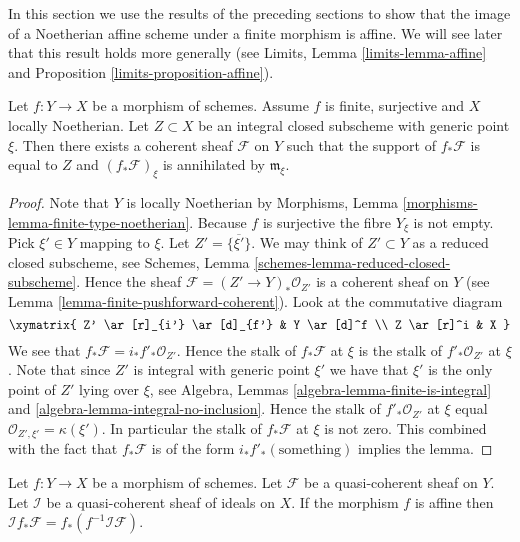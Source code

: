 \noindent
In this section we use the results of the preceding sections
to show that the image of a Noetherian affine scheme under a finite
morphism is affine. We will see later that this result holds more
generally (see Limits, Lemma \ref{limits-lemma-affine} and
Proposition \ref{limits-proposition-affine}).

\begin{lemma}
\label{lemma-finite-morphism-Noetherian}
Let $f : Y \to X$ be a morphism of schemes.
Assume $f$ is finite, surjective and $X$ locally Noetherian.
Let $Z \subset X$ be an integral closed subscheme with
generic point $\xi$. Then
there exists a coherent sheaf $\mathcal{F}$ on $Y$
such that the support of $f_*\mathcal{F}$ is equal to $Z$
and $(f_*\mathcal{F})_\xi$ is annihilated by $\mathfrak m_\xi$.
\end{lemma}

\begin{proof}
Note that $Y$ is locally Noetherian by
Morphisms, Lemma \ref{morphisms-lemma-finite-type-noetherian}.
Because $f$ is surjective the fibre $Y_\xi$ is not empty.
Pick $\xi' \in Y$ mapping to $\xi$. Let $Z' = \overline{\{\xi'\}}$.
We may think of $Z' \subset Y$ as a reduced closed subscheme,
see Schemes, Lemma \ref{schemes-lemma-reduced-closed-subscheme}.
Hence the sheaf $\mathcal{F} = (Z' \to Y)_*\mathcal{O}_{Z'}$
is a coherent sheaf on $Y$ (see
Lemma \ref{lemma-finite-pushforward-coherent}).
Look at the commutative diagram
$$
\xymatrix{
Z' \ar[r]_{i'} \ar[d]_{f'} &
Y \ar[d]^f \\
Z \ar[r]^i &
X
}
$$
We see that $f_*\mathcal{F} = i_*f'_*\mathcal{O}_{Z'}$.
Hence the stalk of $f_*\mathcal{F}$ at $\xi$ is the stalk
of $f'_*\mathcal{O}_{Z'}$ at $\xi$. Note that since $Z'$ is
integral with generic point $\xi'$ we have that
$\xi'$ is the only point of $Z'$ lying over $\xi$, see
Algebra, Lemmas \ref{algebra-lemma-finite-is-integral} and
\ref{algebra-lemma-integral-no-inclusion}.
Hence the stalk of $f'_*\mathcal{O}_{Z'}$ at $\xi$
equal $\mathcal{O}_{Z', \xi'} = \kappa(\xi')$. In particular
the stalk of $f_*\mathcal{F}$ at $\xi$ is not zero.
This combined with the fact that $f_*\mathcal{F}$ is
of the form $i_*f'_*(\text{something})$ implies the lemma.
\end{proof}

\begin{lemma}
\label{lemma-affine-morphism-projection-ideal}
Let $f : Y \to X$ be a morphism of schemes.
Let $\mathcal{F}$ be a quasi-coherent sheaf on $Y$.
Let $\mathcal{I}$ be a quasi-coherent sheaf of ideals on $X$.
If the morphism $f$ is affine then
$\mathcal{I}f_*\mathcal{F} = f_*(f^{-1}\mathcal{I}\mathcal{F})$.
\end{lemma}


